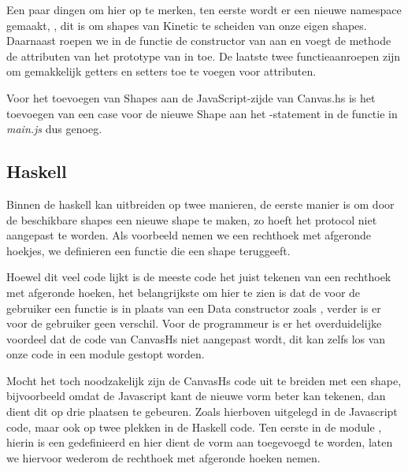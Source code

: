 Een paar dingen om hier op te merken, ten eerste wordt er een nieuwe namespace gemaakt, , dit is om shapes van Kinetic te scheiden van onze eigen shapes. Daarnaast roepen we in de  functie de constructor van  aan en voegt de  methode de attributen van het prototype van  in  toe. De laatste twee functieaanroepen zijn om gemakkelijk getters en setters toe te voegen voor attributen.

Voor het toevoegen van Shapes aan de JavaScript-zijde van Canvas.hs is het toevoegen van een case voor de nieuwe Shape aan het -statement in de  functie in \emph{main.js} dus genoeg.

\subsection{Haskell}

Binnen de haskell kan uitbreiden op twee manieren, de eerste manier is om door de beschikbare shapes een nieuwe shape te maken, zo hoeft het protocol niet aangepast te worden. Als voorbeeld nemen we een rechthoek met afgeronde hoekjes, we definieren een functie  die een shape teruggeeft.



Hoewel dit veel code lijkt is de meeste code het juist tekenen van een rechthoek met afgeronde hoeken, het belangrijkste om hier te zien is dat de  voor de gebruiker een functie is in plaats van een Data constructor zoals , verder is er voor de gebruiker geen verschil. Voor de programmeur is er het overduidelijke voordeel dat de code van CanvasHs niet aangepast wordt, dit kan zelfs los van onze code in een module gestopt worden.

Mocht het toch noodzakelijk zijn de CanvasHs code uit te breiden met een shape, bijvoorbeeld omdat de Javascript kant de nieuwe vorm beter kan tekenen, dan dient dit op drie plaatsen te gebeuren. Zoals hierboven uitgelegd in de Javascript code, maar ook op twee plekken in de Haskell code. Ten eerste in de module , hierin is een  gedefinieerd en hier dient de vorm aan toegevoegd te worden, laten we hiervoor wederom de rechthoek met afgeronde hoeken nemen.

